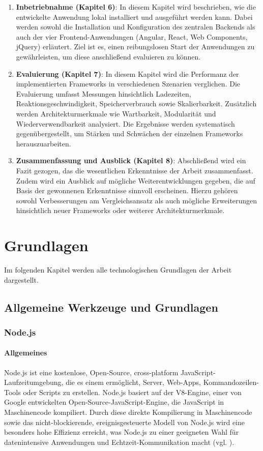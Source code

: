 \documentclass[oneside]{ausarbeitung}
\begin{document}
\begin{enumerate}
\item \textbf{Inbetriebnahme (Kapitel 6)}: In diesem Kapitel wird beschrieben, wie die entwickelte Anwendung lokal installiert und ausgeführt werden kann. Dabei werden sowohl die Installation und Konfiguration des zentralen Backends als auch der vier Frontend-Anwendungen (Angular, React, Web Components, jQuery) erläutert. Ziel ist es, einen reibungslosen Start der Anwendungen zu gewährleisten, um diese anschließend evaluieren zu können.

\item \textbf{Evaluierung (Kapitel 7)}: In diesem Kapitel wird die Performanz der implementierten Frameworks in verschiedenen Szenarien verglichen. Die Evaluierung umfasst Messungen hinsichtlich Ladezeiten, Reaktionsgeschwindigkeit, Speicherverbrauch sowie Skalierbarkeit. Zusätzlich werden Architekturmerkmale wie Wartbarkeit, Modularität und Wiederverwendbarkeit analysiert. Die Ergebnisse werden systematisch gegenübergestellt, um Stärken und Schwächen der einzelnen Frameworks herauszuarbeiten.

\item \textbf{Zusammenfassung und Ausblick (Kapitel 8)}: Abschließend wird ein Fazit gezogen, das die wesentlichen Erkenntnisse der Arbeit zusammenfasst. Zudem wird ein Ausblick auf mögliche Weiterentwicklungen gegeben, die auf Basis der gewonnenen Erkenntnisse sinnvoll erscheinen. Hierzu gehören sowohl Verbesserungen am Vergleichsansatz als auch mögliche Erweiterungen hinsichtlich neuer Frameworks oder weiterer Architekturmerkmale.
\end{enumerate}  
\chapter{Grundlagen}
\label{chap:grundlagen}

Im folgenden Kapitel werden alle technologischen Grundlagen der Arbeit dargestellt.

\section{Allgemeine Werkzeuge und Grundlagen}
\subsection{Node.js}
\subsubsection{Allgemeines}
Node.js ist eine kostenlose, Open-Source, cross-platform JavaScript-Laufzeitumgebung, die es einem ermöglicht, Server, Web-Apps, Kommandozeilen-Tools oder Scripts zu erstellen. Node.js basiert auf der V8-Engine, einer von Google entwickelten Open-Source-JavaScript-Engine, die JavaScript in Maschinencode kompiliert. Durch diese direkte Kompilierung in Maschinencode sowie das nicht-blockierende, ereignisgesteuerte Modell von Node.js wird eine besonders hohe Effizienz erreicht, was Node.js zu einer geeigneten Wahl für datenintensive Anwendungen und Echtzeit-Kommunikation macht (vgl. \parencite{nodejs}).
\end{document}
